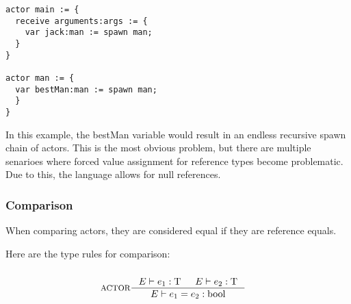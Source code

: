 \begin{lstlisting}
actor main := {
  receive arguments:args := {
    var jack:man := spawn man;
  }
}

actor man := {
  var bestMan:man := spawn man;
  }
}
\end{lstlisting}

In this example, the bestMan variable would result in an endless recursive spawn chain of actors. This is the most obvious problem, but there are multiple senarioes where forced value assignment for reference types become problematic. Due to this, the language allows for null references.

\subsubsection{Comparison}

When comparing actors, they are considered equal if they are reference equals.

Here are the type rules for comparison:

\begin{align*}
\intertext{}
&\inference[ACTOR]{\Tenv e_1: \Tt & \Tenv e_2: \Tt}
                 {\Tenv e_1 = e_2: \Tbool}                 
\end{align*}
